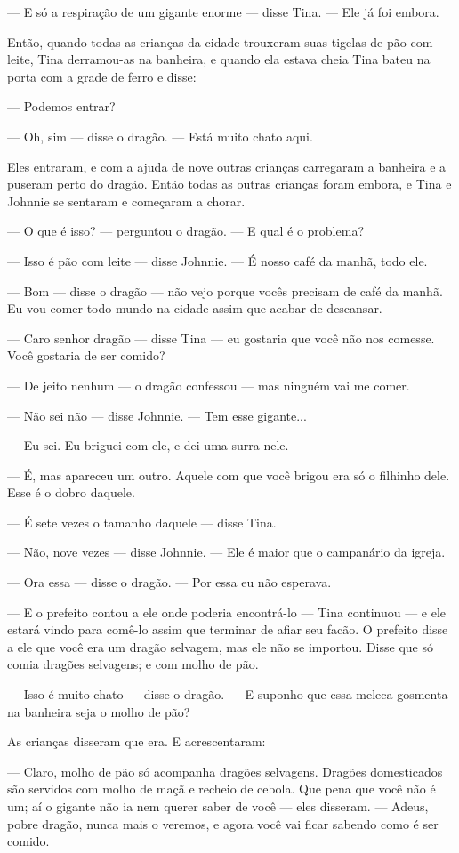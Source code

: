 — E só a respiração de um gigante enorme — disse Tina. — Ele já foi
embora.

Então, quando todas as crianças da cidade trouxeram suas tigelas de
pão com leite, Tina derramou-as na banheira, e quando ela estava
cheia Tina bateu na porta com a grade de ferro e disse:

— Podemos entrar?

— Oh, sim — disse o dragão. — Está muito chato aqui.

Eles entraram, e com a ajuda de nove outras crianças carregaram a
banheira e a puseram perto do dragão. Então todas as outras crianças
foram embora, e Tina e Johnnie se sentaram e começaram a chorar.

— O que é isso? — perguntou o dragão. — E qual é o problema?

— Isso é pão com leite — disse Johnnie. — É nosso café da manhã, todo
ele.

— Bom — disse o dragão — não vejo porque vocês precisam de café da
manhã. Eu vou comer todo mundo na cidade assim que acabar de
descansar.

— Caro senhor dragão — disse Tina — eu gostaria que você não nos
comesse. Você gostaria de ser comido?

— De jeito nenhum — o dragão confessou — mas ninguém vai me comer.

— Não sei não — disse Johnnie. — Tem esse gigante...

— Eu sei. Eu briguei com ele, e dei uma surra nele.

— É, mas apareceu um outro. Aquele com que você brigou era só o
filhinho dele. Esse é o dobro daquele.

— É sete vezes o tamanho daquele — disse Tina.

— Não, nove vezes — disse Johnnie. — Ele é maior que o campanário da
igreja.

— Ora essa — disse o dragão. — Por essa eu não esperava.

— E o prefeito contou a ele onde poderia encontrá-lo — Tina continuou
— e ele estará vindo para comê-lo assim que terminar de afiar seu
facão. O prefeito disse a ele que você era um dragão selvagem, mas
ele não se importou. Disse que só comia dragões selvagens; e com
molho de pão.

— Isso é muito chato — disse o dragão. — E suponho que essa meleca
gosmenta na banheira seja o molho de pão?

As crianças disseram que era. E acrescentaram:

— Claro, molho de pão só acompanha dragões selvagens. Dragões
domesticados são servidos com molho de maçã e recheio de cebola. Que
pena que você não é um; aí o gigante não ia nem querer saber de você
— eles disseram. — Adeus, pobre dragão, nunca mais o veremos, e agora
você vai ficar sabendo como é ser comido.

